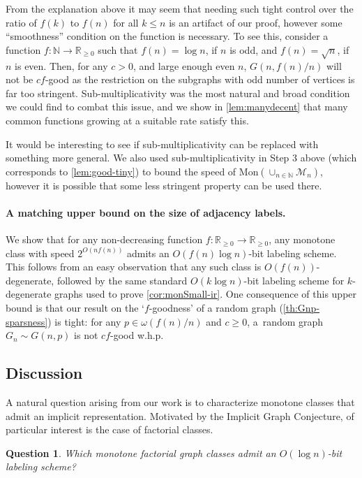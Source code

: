\documentclass[letterpaper,11pt]{article}
\newcommand{\Smul}{sub-multiplicativity\xspace}
\newcommand{\Nn}{\mathbb{N}}
\newcommand{\Rrr}{\mathbb{R}_{\geq 0}}
\newcommand{\Mc}{\mathcal{M}}
\newtheorem{question}{Question}
\theoremstyle{definition}
\theoremstyle{remark}
\newcommand{\mon}{\mathrm{Mon}}
\renewcommand{\leq}{\leqslant}
\renewcommand{\geq}{\geqslant}
\begin{document}
	From the explanation above it may seem that needing such tight control over the ratio of $f(k)$ to $f(n)$ for all $k\leq n$ is an artifact of our proof, however some ``smoothness'' condition on the function is necessary.   To see this, consider
	a function $f : \Nn \rightarrow \Rrr$ such that $f(n) = \log n$, if $n$ is odd, and $f(n) = \sqrt{n}$, if $n$ is even. Then, for any $c > 0$, and large enough even $n$, $G(n,f(n)/n)$ will not be $cf$-good as the restriction on the subgraphs with odd number of vertices is far too stringent. Sub-multiplicativity was the most natural and broad condition we could find to combat this issue, and we show in \cref{lem:manydecent} that many common functions growing at a suitable rate satisfy this. 
	
	It would be interesting to see if \Smul can be replaced with something more general. We also used \Smul in Step 3 above (which corresponds to \cref{lem:good-tiny}) to bound the speed of $\mon(\cup_{n \in \Nn} \Mc_{n})$, however it is possible that some less stringent property can be used there. 
	
	
	\paragraph{A matching upper bound on the size of adjacency labels.} 
	We show that for any non-decreasing function $f : \Rrr \rightarrow \Rrr$, any monotone class
	with speed $2^{O(n f(n))}$ admits an $O(f(n)\log n)$-bit labeling scheme.
	This follows from an easy observation that any such class is $O(f(n))$-degenerate, followed by the same standard $O(k \log n)$-bit labeling scheme for $k$-degenerate graphs used to prove \cref{cor:monSmall-ir}.
	One consequence of this upper bound is that our result on the `$f$-goodness' of a random graph (\cref{th:Gnp-sparsness}) is tight: for any $p \in \omega(f(n)/n)$ and $c \geq 0$, a~random graph $G_n \sim G(n, p)$ is not $cf$-good w.h.p.
	
	
	
	
	\subsection{Discussion}\label{sec:discussion}
	A natural question arising from our work is to characterize monotone classes that admit an implicit representation.
        Motivated by the Implicit Graph Conjecture, of particular interest is the case of factorial classes.
	
	\begin{question}\label{q:monotone-igc}
		Which \emph{monotone} factorial graph classes admit an $O(\log n)$-bit labeling scheme?
	\end{question}
	
\end{document}
